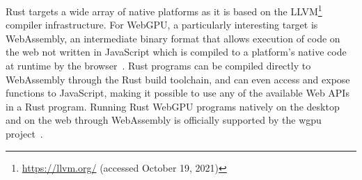 Rust targets a wide array of native platforms as it is based on the LLVM\footnote{\url{https://llvm.org/} (accessed October 19, 2021)} compiler infrastructure.
For WebGPU, a particularly interesting target is WebAssembly, an intermediate binary format that allows execution of code on the web not written in JavaScript which is compiled to a platform's native code at runtime by the browser~\cite{mdncontributorsCompilingRustWebAssembly2021}.
Rust programs can be compiled directly to WebAssembly through the Rust build toolchain, and can even access and expose functions to JavaScript, making it possible to use any of the available Web APIs in a Rust program.
Running Rust WebGPU programs natively on the desktop and on the web through WebAssembly is officially supported by the wgpu project~\cite{malyshauRunningWebWebGPU2021}.

